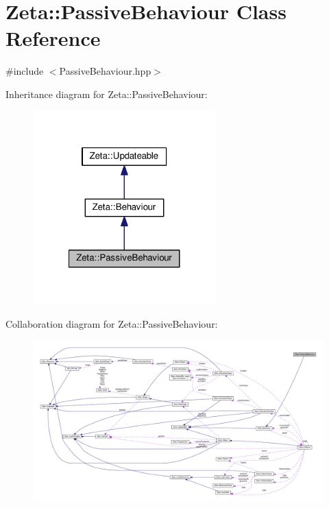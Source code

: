 \hypertarget{classZeta_1_1PassiveBehaviour}{\section{Zeta\+:\+:Passive\+Behaviour Class Reference}
\label{classZeta_1_1PassiveBehaviour}
}


{\ttfamily \#include $<$Passive\+Behaviour.\+hpp$>$}



Inheritance diagram for Zeta\+:\+:Passive\+Behaviour\+:\nopagebreak
\begin{figure}[H]
\begin{center}
\leavevmode
\includegraphics[width=200pt]{classZeta_1_1PassiveBehaviour__inherit__graph}
\end{center}
\end{figure}


Collaboration diagram for Zeta\+:\+:Passive\+Behaviour\+:
\nopagebreak
\begin{figure}[H]
\begin{center}
\leavevmode
\includegraphics[width=350pt]{classZeta_1_1PassiveBehaviour__coll__graph}
\end{center}
\end{figure}
